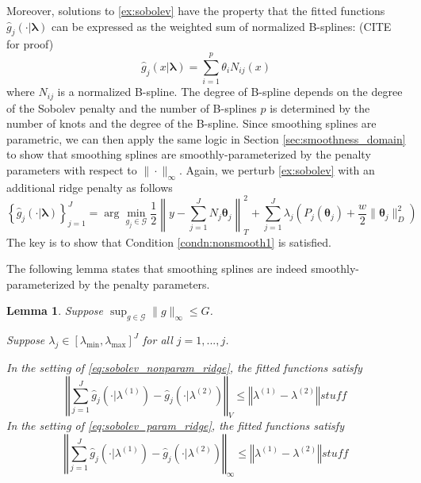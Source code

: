 \documentclass[12pt]{article}
\newtheorem{lemma}{Lemma}
\begin{document}
Moreover, solutions to \eqref{ex:sobolev} have the property that the fitted functions $\hat{g}_j(\cdot | \boldsymbol \lambda)$ can be expressed as the weighted sum of normalized B-splines: (CITE for proof) 
\begin{equation}
\hat{g}_j(x | \boldsymbol \lambda) = \sum_{i=1}^{p} \theta_i N_{ij}(x)
\end{equation}
where $N_{ij}$ is a normalized B-spline. The degree of B-spline depends on the degree of the Sobolev penalty and the number of B-splines $p$ is determined by the number of knots and the degree of the B-spline.
Since smoothing splines are parametric, we can then apply the same logic in Section \ref{sec:smoothness_domain} to show that smoothing splines are smoothly-parameterized by the penalty parameters with respect to $\|\cdot\|_\infty$. Again, we perturb \eqref{ex:sobolev} with an additional ridge penalty as follows
\begin{equation}
\label{eq:sobolev_param_ridge}
\left \{ \hat{g}_j(\cdot | \boldsymbol \lambda) \right \}_{j=1}^J =
\arg\min_{g_j\in\mathcal{G}}
\frac{1}{2} \left \|y- \sum_{j=1}^J N_j \boldsymbol{\theta}_j \right \|_{T}^{2}
+ \sum_{j=1}^J \lambda_j 
\left (
P_j(\boldsymbol{\theta}_j)
+ \frac{w}{2} \| \boldsymbol{\theta}_j \|^2_D
\right )
\end{equation}
The key is to show that Condition \ref{condn:nonsmooth1} is satisfied. 

The following lemma states that smoothing splines are indeed smoothly-parameterized by the penalty parameters.
\begin{lemma}
\label{lemma:sobolev}
Suppose $\sup_{g \in \mathcal{G}} \|g\|_\infty \le G$.

Suppose $\lambda_j \in [\lambda_{\min}, \lambda_{\max}]^J$ for all $j=1,...,j$.

In the setting of \eqref{eq:sobolev_nonparam_ridge}, the fitted functions satisfy
\begin{equation}
\left\Vert \sum_{j=1}^J \hat{g}_j(\cdot|\lambda^{(1)}) - \hat{g}_j(\cdot|\lambda^{(2)}) \right\Vert _V
\le
\left\Vert \lambda^{(1)}-\lambda^{(2)}\right\Vert
stuff
\end{equation}
In the setting of \eqref{eq:sobolev_param_ridge}, the fitted functions satisfy
\begin{equation}
\left\Vert \sum_{j=1}^J \hat{g}_j(\cdot|\lambda^{(1)}) - \hat{g}_j(\cdot|\lambda^{(2)}) \right\Vert _\infty
\le
\left\Vert \lambda^{(1)}-\lambda^{(2)}\right\Vert
stuff
\end{equation}
\end{lemma}
\end{document}

